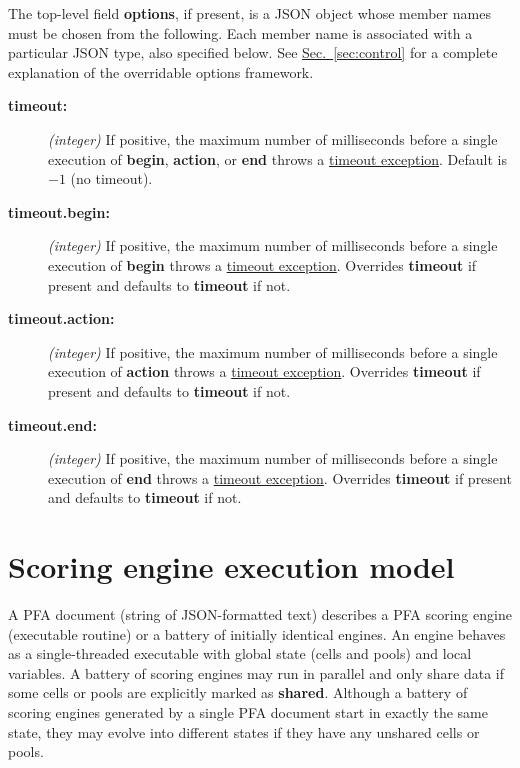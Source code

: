 \documentclass{article}
\newcommand{\PFAc}{\ttfamily\bfseries}
\newenvironment{allowedfields}%
  {\begin{center} \begin{minipage}{0.9\linewidth} \begin{description}}%
  {\end{description} \end{minipage} \end{center}}
\theoremstyle{definition}
\begin{document}
The top-level field {\PFAc options}, if present, is a JSON object whose member names must be chosen from the following.  Each member name is associated with a particular JSON type, also specified below.  See \hyperlink{hsec:state}{Sec.~\ref{sec:control}} for a complete explanation of the overridable options framework.
\begin{allowedfields}
\item[\PFAc timeout:] {\it (integer)} If positive, the maximum number of milliseconds before a single execution of {\PFAc begin}, {\PFAc action}, or {\PFAc end} throws a \hyperlink{hsec:exceptions}{timeout exception}.  Default is $-1$ (no timeout).
\item[\PFAc timeout.begin:] {\it (integer)} If positive, the maximum number of milliseconds before a single execution of {\PFAc begin} throws a \hyperlink{hsec:exceptions}{timeout exception}.  Overrides {\PFAc timeout} if present and defaults to {\PFAc timeout} if not.
\item[\PFAc timeout.action:] {\it (integer)} If positive, the maximum number of milliseconds before a single execution of {\PFAc action} throws a \hyperlink{hsec:exceptions}{timeout exception}.  Overrides {\PFAc timeout} if present and defaults to {\PFAc timeout} if not.
\item[\PFAc timeout.end:] {\it (integer)} If positive, the maximum number of milliseconds before a single execution of {\PFAc end} throws a \hyperlink{hsec:exceptions}{timeout exception}.  Overrides {\PFAc timeout} if present and defaults to {\PFAc timeout} if not.
\end{allowedfields}

\pagebreak

\section{Scoring engine execution model}

A PFA document (string of JSON-formatted text) describes a PFA scoring engine (executable routine) or a battery of initially identical engines.  An engine behaves as a single-threaded executable with global state (cells and pools) and local variables.  A battery of scoring engines may run in parallel and only share data if some cells or pools are explicitly marked as {\PFAc shared}.  Although a battery of scoring engines generated by a single PFA document start in exactly the same state, they may evolve into different states if they have any unshared cells or pools.
\end{document}
